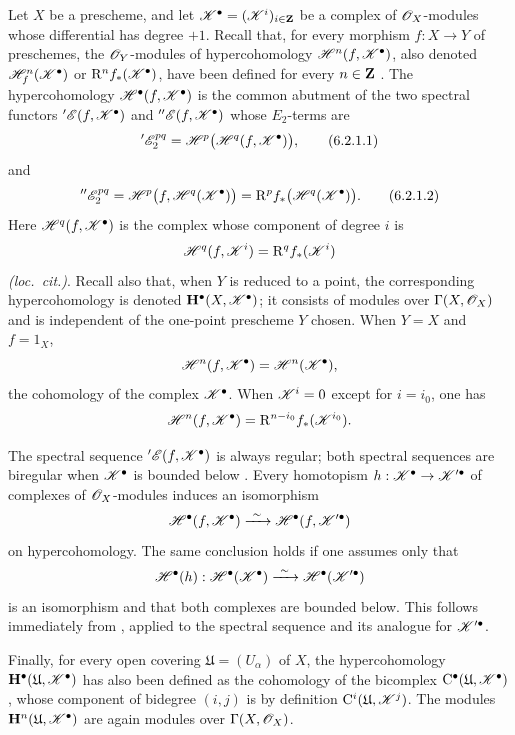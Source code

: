 \begin{env}[6.2.1]
\label{III.6.2.1}
Let $X$ be a prescheme, and let
$\mathscr{K}^\bullet=(\mathscr{K}^i)_{i\in\mathbf{Z}}$ be a complex of
$\mathscr{O}_X$-modules whose differential has degree $+1$.
Recall that, for every morphism $f:X\to Y$ of preschemes, the
$\mathscr{O}_Y$-modules of hypercohomology
$\mathscr{H}^n(f,\mathscr{K}^\bullet)$, also denoted
$\mathscr{H}_f^n(\mathscr{K}^\bullet)$ or
$\mathrm R^n f_*(\mathscr{K}^\bullet)$, have been defined for every
$n\in\mathbf{Z}$ .  The hypercohomology
$\mathscr{H}^\bullet(f,\mathscr{K}^\bullet)$ is the common abutment of
the two spectral functors
$'\mathscr{E}(f,\mathscr{K}^\bullet)$ and
$''\mathscr{E}(f,\mathscr{K}^\bullet)$ whose $E_2$-terms are
\[
  '\sh{E}_2^{pq}
  =
  \sh{H}^p\bigl(\sh{H}^q(f,\sh{K}^\bullet)\bigr),
  \tag{6.2.1.1}\label{III.6.2.1.1}
\]
and
\[
  ''\sh{E}_2^{pq}
  =
  \sh{H}^p\bigl(f,\sh{H}^q(\sh{K}^\bullet)\bigr)
  =
  \RR^p f_*\bigl(\sh{H}^q(\sh{K}^\bullet)\bigr).
  \tag{6.2.1.2}\label{III.6.2.1.2}
\]
Here $\mathscr{H}^q(f,\mathscr{K}^\bullet)$ is the complex whose component
of degree $i$ is
\[
  \mathscr{H}^q(f,\mathscr{K}^i)=\mathrm R^q f_*(\mathscr{K}^i)
\]
\emph{(loc.\ cit.)}.  Recall also that, when $Y$ is reduced to a
point, the corresponding hypercohomology is denoted
$\mathbf{H}^\bullet(X,\mathscr{K}^\bullet)$; it consists of modules
over $\Gamma(X,\mathscr{O}_X)$ and is independent of the one-point
prescheme $Y$ chosen.  When $Y=X$ and $f=1_X$,
\[
  \mathscr{H}^n(f,\mathscr{K}^\bullet)
  =
  \mathscr{H}^n(\mathscr{K}^\bullet),
\]
the cohomology of the complex $\mathscr{K}^\bullet$.  When
$\mathscr{K}^i=0$ except for $i=i_0$, one has
\[
  \mathscr{H}^n(f,\mathscr{K}^\bullet)
  =
  \mathrm R^{n-i_0}f_*(\mathscr{K}^{i_0}).
\]

The spectral sequence $'\mathscr{E}(f,\mathscr{K}^\bullet)$ is always
regular; both spectral sequences are biregular when
$\mathscr{K}^\bullet$ is bounded below .
Every homotopism
$h:\mathscr{K}^\bullet\to\mathscr{K}'^\bullet$ of complexes of
$\mathscr{O}_X$-modules  induces an isomorphism
\[
  \mathscr{H}^\bullet(f,\mathscr{K}^\bullet)
  \xrightarrow{\ \sim\ }
  \mathscr{H}^\bullet(f,\mathscr{K}'^\bullet)
\]
on hypercohomology.  The same conclusion holds if one assumes only
that
\[
  \mathscr{H}^\bullet(h):
  \mathscr{H}^\bullet(\mathscr{K}^\bullet)
  \xrightarrow{\ \sim\ }
  \mathscr{H}^\bullet(\mathscr{K}'^\bullet)
\]
is an isomorphism and that both complexes are bounded below.  This
follows immediately from , applied to the
spectral sequence  and its analogue for
$\mathscr{K}'^\bullet$.

Finally, for every open covering
$\mathfrak{U}=(U_\alpha)$ of $X$, the hypercohomology
$\mathbf{H}^\bullet(\mathfrak{U},\mathscr{K}^\bullet)$ has also been
defined  as the cohomology of the bicomplex
$\mathrm{C}^\bullet(\mathfrak{U},\mathscr{K}^\bullet)$, whose component
of bidegree $(i,j)$ is by definition
$\mathrm{C}^i(\mathfrak{U},\mathscr{K}^j)$.  The modules
$\mathbf{H}^n(\mathfrak{U},\mathscr{K}^\bullet)$ are again modules over
$\Gamma(X,\mathscr{O}_X)$.
\end{env}

